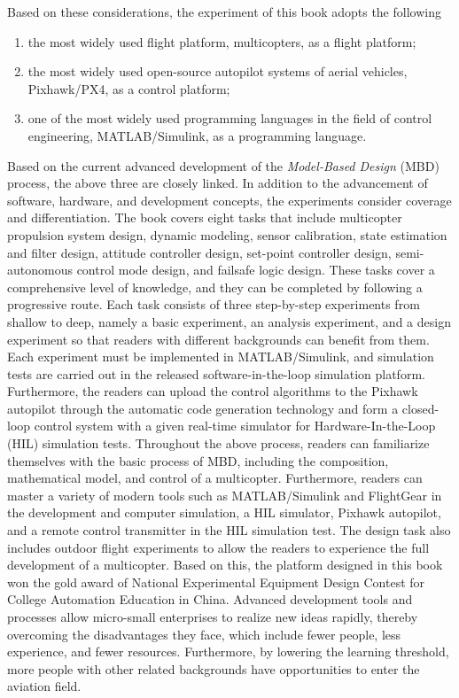 Based on these considerations, the experiment of this book adopts
the following
\begin{enumerate}[(1) ]
\item the most widely used flight platform, multicopters, as a flight platform;
\item the most widely used open-source autopilot systems of aerial vehicles,
Pixhawk/PX4, as a control platform;
\item one of the most widely used programming languages in the field of
control engineering, MATLAB/Simulink, as a programming language.
\end{enumerate}
Based on the current advanced development of the \textit{Model-Based
Design} (MBD) process, the above three are closely linked. In addition
to the advancement of software, hardware, and development concepts,
the experiments consider coverage and differentiation. The book covers
eight tasks that include multicopter propulsion system design, dynamic
modeling, sensor calibration, state estimation and filter design,
attitude controller design, set-point controller design, semi-autonomous
control mode design, and failsafe logic design. These tasks cover
a comprehensive level of knowledge, and they can be completed by following
a progressive route. Each task consists of three step-by-step experiments
from shallow to deep, namely a basic experiment, an analysis experiment,
and a design experiment so that readers with different backgrounds
can benefit from them. Each experiment must be implemented in MATLAB/Simulink,
and simulation tests are carried out in the released software-in-the-loop
simulation platform. Furthermore, the readers can upload the control
algorithms to the Pixhawk autopilot through the automatic code generation
technology and form a closed-loop control system with a given real-time
simulator for Hardware-In-the-Loop (HIL) simulation tests. Throughout
the above process, readers can familiarize themselves with the basic
process of MBD, including the composition, mathematical model, and
control of a multicopter. Furthermore, readers can master a variety
of modern tools such as MATLAB/Simulink and FlightGear in the development
and computer simulation, a  HIL simulator, Pixhawk autopilot, and
a remote control transmitter in the HIL simulation test. The design
task also includes outdoor flight experiments to allow the readers
to experience the full development of a multicopter. Based on this,
the platform designed in this book won the gold award of National
Experimental Equipment Design Contest for College Automation Education
in China. Advanced development tools and processes allow micro-small
enterprises to realize new ideas rapidly, thereby overcoming the disadvantages
they face, which include fewer people, less experience, and fewer
resources. Furthermore, by lowering the learning threshold, more people
with other related backgrounds have opportunities to enter the aviation
field. 

